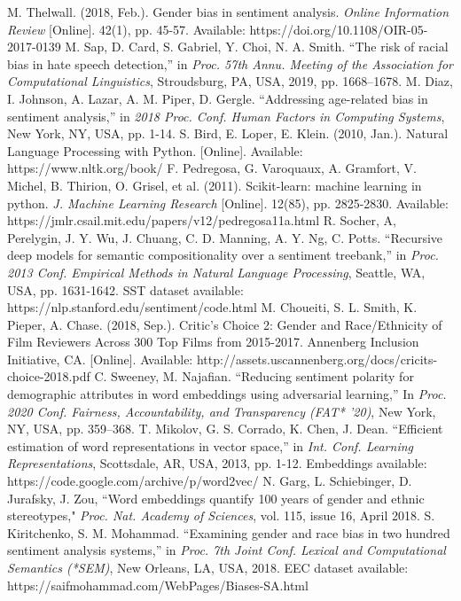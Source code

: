 \documentclass[a4paper]{IEEEtran}
\begin{document}
\newpage

\begin{thebibliography}{00}
 M. Thelwall. (2018, Feb.). Gender bias in sentiment analysis. \textit{Online Information Review} [Online]. 42(1), pp. 45-57. Available: https://doi.org/10.1108/OIR-05-2017-0139 
 M. Sap, D. Card, S. Gabriel, Y. Choi, N. A. Smith. ``The risk of racial bias in hate speech detection,'' in \textit{Proc. 57th Annu. Meeting of the Association for Computational Linguistics}, Stroudsburg, PA, USA, 2019, pp. 1668–1678.
 M. Diaz, I. Johnson, A. Lazar, A. M. Piper, D. Gergle. ``Addressing age-related bias in sentiment analysis,'' in \textit{2018 Proc. Conf. Human Factors in Computing Systems}, New York, NY, USA, pp. 1-14.
 S. Bird, E. Loper, E. Klein. (2010, Jan.). Natural Language Processing with Python. [Online]. Available: https://www.nltk.org/book/
 F. Pedregosa, G. Varoquaux, A. Gramfort, V. Michel, B. Thirion, O. Grisel, et al. (2011). Scikit-learn: machine learning in python. \textit{J. Machine Learning Research} [Online]. 12(85), pp. 2825-2830. Available: https://jmlr.csail.mit.edu/papers/v12/pedregosa11a.html
 R. Socher, A, Perelygin, J. Y. Wu, J. Chuang, C. D. Manning, A. Y. Ng, C. Potts. ``Recursive deep models for semantic compositionality over a sentiment treebank,'' in \textit{Proc. 2013 Conf. Empirical Methods in Natural Language Processing}, Seattle, WA, USA, pp. 1631-1642. SST dataset available: https://nlp.stanford.edu/sentiment/code.html
 M. Choueiti, S. L. Smith, K. Pieper, A. Chase. (2018, Sep.). Critic's Choice 2: Gender and Race/Ethnicity of Film Reviewers Across 300 Top Films from 2015-2017. Annenberg Inclusion Initiative, CA. [Online]. Available: http://assets.uscannenberg.org/docs/cricits-choice-2018.pdf
 C. Sweeney, M. Najafian. ``Reducing sentiment polarity for demographic attributes in word embeddings using adversarial learning,'' In \textit{Proc. 2020 Conf. Fairness, Accountability, and Transparency (FAT* '20)}, New York, NY, USA, pp. 359–368.
 T. Mikolov, G. S. Corrado, K. Chen, J. Dean. ``Efficient estimation of word representations in vector space,'' in \textit{Int. Conf. Learning Representations}, Scottsdale, AR, USA, 2013, pp. 1-12. Embeddings available: https://code.google.com/archive/p/word2vec/ 
 N. Garg, L. Schiebinger, D. Jurafsky, J. Zou, ``Word embeddings quantify 100 years of gender and ethnic stereotypes," \textit{Proc. Nat. Academy of Sciences}, vol. 115, issue 16, April 2018. 
 S. Kiritchenko, S. M. Mohammad. ``Examining gender and race bias in two hundred sentiment analysis systems,'' in \textit{Proc. 7th Joint Conf.  Lexical and Computational Semantics (*SEM)}, New Orleans, LA, USA, 2018. EEC dataset available: https://saifmohammad.com/WebPages/Biases-SA.html

\end{thebibliography}
\end{document}
